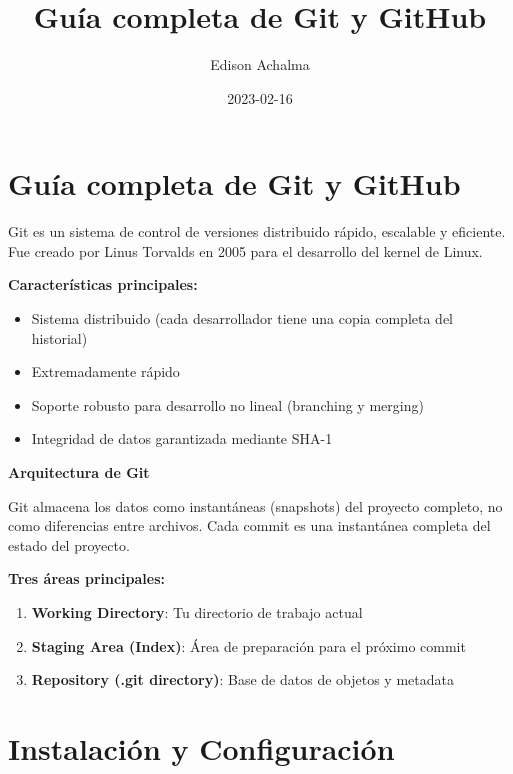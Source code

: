 \documentclass[
  doc,
  floatsintext,
  longtable,
  a4paper,
  nolmodern,
  notxfonts,
  notimes,
  12pt,
  colorlinks=true,linkcolor=blue,citecolor=blue,urlcolor=blue]{apa7}
\title{Guía completa de Git y GitHub}
\author{Edison Achalma}
\affiliation{
{Escuela Profesional de Economía, Universidad Nacional de San Cristóbal
de Huamanga}}
\date{2023-02-16}
\providecommand{\tightlist}{%
  \setlength{\itemsep}{0pt}\setlength{\parskip}{0pt}}
\begin{document}
\maketitle


\hypertarget{toc}{}
\tableofcontents
\newpage
\section[Introduction]{Guía completa de Git y GitHub}

\setcounter{secnumdepth}{3}

\setlength\LTleft{0pt}




Git es un sistema de control de versiones distribuido rápido, escalable
y eficiente. Fue creado por Linus Torvalds en 2005 para el desarrollo
del kernel de Linux.

\textbf{Características principales:}

\begin{itemize}
\tightlist
\item
  Sistema distribuido (cada desarrollador tiene una copia completa del
  historial)
\item
  Extremadamente rápido
\item
  Soporte robusto para desarrollo no lineal (branching y merging)
\item
  Integridad de datos garantizada mediante SHA-1
\end{itemize}

\textbf{Arquitectura de Git}

Git almacena los datos como instantáneas (snapshots) del proyecto
completo, no como diferencias entre archivos. Cada commit es una
instantánea completa del estado del proyecto.

\textbf{Tres áreas principales:}

\begin{enumerate}
\def\labelenumi{\arabic{enumi}.}
\tightlist
\item
  \textbf{Working Directory}: Tu directorio de trabajo actual
\item
  \textbf{Staging Area (Index)}: Área de preparación para el próximo
  commit
\item
  \textbf{Repository (.git directory)}: Base de datos de objetos y
  metadata
\end{enumerate}

\section{Instalación y
Configuración}\label{instalaciuxf3n-y-configuraciuxf3n}
\end{document}
